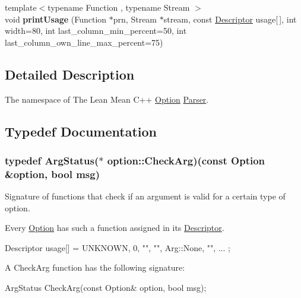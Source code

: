 \begin{DoxyCompactItemize}
\item 
\hypertarget{namespaceoption_a27bfa29dc37bb1bfc5e0b891509e5881}{{\footnotesize template$<$typename Function , typename Stream $>$ }\\void {\bfseries print\-Usage} (\-Function $\ast$prn, \-Stream $\ast$stream, const \hyperlink{structoption_1_1_descriptor}{\-Descriptor} usage\mbox{[}$\,$\mbox{]}, int width=80, int last\-\_\-column\-\_\-min\-\_\-percent=50, int last\-\_\-column\-\_\-own\-\_\-line\-\_\-max\-\_\-percent=75)}\label{namespaceoption_a27bfa29dc37bb1bfc5e0b891509e5881}

\end{DoxyCompactItemize}


\subsection{\-Detailed \-Description}
\-The namespace of \-The \-Lean \-Mean \-C++ \hyperlink{classoption_1_1_option}{\-Option} \hyperlink{classoption_1_1_parser}{\-Parser}. 

\subsection{\-Typedef \-Documentation}
\hypertarget{namespaceoption_a4afb7f04597f34439679509baf4b6d39}{
\subsubsection[{\-Check\-Arg}]{\setlength{\rightskip}{0pt plus 5cm}typedef {\bf \-Arg\-Status}($\ast$ {\bf option\-::\-Check\-Arg})(const {\bf \-Option} \&option, bool msg)}}\label{namespaceoption_a4afb7f04597f34439679509baf4b6d39}


\-Signature of functions that check if an argument is valid for a certain type of option. 

\-Every \hyperlink{classoption_1_1_option}{\-Option} has such a function assigned in its \hyperlink{structoption_1_1_descriptor}{\-Descriptor}. 
\begin{DoxyCode}
 Descriptor usage[] = { {UNKNOWN, 0, "", "", Arg::None, ""}, ... };
\end{DoxyCode}


\-A \-Check\-Arg function has the following signature\-: 
\begin{DoxyCode}
 ArgStatus CheckArg(const Option& option, bool msg); 
\end{DoxyCode}


